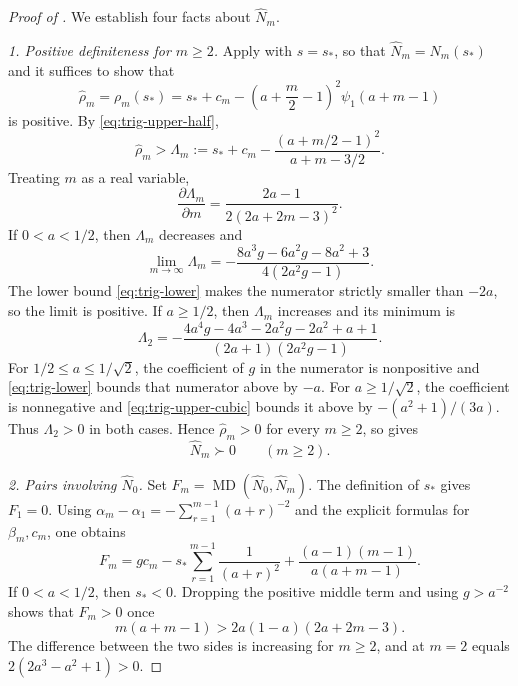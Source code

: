 \documentclass[11pt,a4paper]{amsart}
\numberwithin{equation}{section}
\theoremstyle{plain}
\theoremstyle{definition}
\newcommand{\MD}{\operatorname{MD}}
\begin{document}
\begin{proof}[Proof of ]
We establish four facts about \(\widehat N_m\).

\emph{1.  Positive definiteness for \(m\ge2\).}
Apply  with \(s=s_*\), so that \(\widehat N_m=N_m(s_*)\) and it suffices to show that
\[
 \widehat\rho_m
 =\rho_m(s_*)
 =s_*+c_m-\left(a+\frac m2-1\right)^2\psi_1(a+m-1)
\]
is positive.
By \eqref{eq:trig-upper-half},
\[
 \widehat\rho_m>\Lambda_m
 :=s_*+c_m-
 \frac{(a+m/2-1)^2}{a+m-3/2}.
\]
Treating \(m\) as a real variable,
\begin{equation}\label{eq:Lm-derivative}
 \frac{\partial \Lambda_m}{\partial m}
 =\frac{2a-1}{2(2a+2m-3)^2}.
\end{equation}
If \(0<a<1/2\), then \(\Lambda_m\) decreases and
\[
 \lim_{m\to\infty}\Lambda_m
 =-\frac{8a^3g-6a^2g-8a^2+3}{4(2a^2g-1)}.
\]
The lower bound \eqref{eq:trig-lower} makes the numerator strictly smaller than
\(-2a\), so the limit is positive.  If \(a\ge1/2\), then \(\Lambda_m\) increases and
its minimum is
\[
 \Lambda_2=-\frac{4a^4g-4a^3-2a^2g-2a^2+a+1}
 {(2a+1)(2a^2g-1)}.
\]
For \(1/2\le a\le1/\sqrt2\), the coefficient of \(g\) in the numerator is
nonpositive and \eqref{eq:trig-lower} bounds that numerator above by \(-a\).
For \(a\ge1/\sqrt2\), the coefficient is nonnegative and
\eqref{eq:trig-upper-cubic} bounds it above by
\(-(a^2+1)/(3a)\).  Thus \(\Lambda_2>0\) in both cases.  Hence
\(\widehat\rho_m>0\) for every \(m\ge2\), so  gives
\begin{equation}\label{eq:Nhat-m-pd}
 \widehat N_m\succ0\qquad(m\ge2).
\end{equation}

\emph{2.  Pairs involving \(\widehat N_0\).}
Set
\(F_m=\MD(\widehat N_0,\widehat N_m)\).  The definition of \(s_*\) gives
\(F_1=0\).  Using
\(\alpha_m-\alpha_1=-\sum_{r=1}^{m-1}(a+r)^{-2}\) and the explicit formulas for
\(\beta_m,c_m\), one obtains
\begin{equation}\label{eq:Fm-boundary}
 F_m
 =gc_m-s_*\sum_{r=1}^{m-1}\frac1{(a+r)^2}
 +\frac{(a-1)(m-1)}{a(a+m-1)}.
\end{equation}
If \(0<a<1/2\), then \(s_*<0\).  Dropping the positive middle term and using
\(g>a^{-2}\) shows that \(F_m>0\) once
\[
 m(a+m-1)>2a(1-a)(2a+2m-3).
\]
The difference between the two sides is increasing for \(m\ge2\), and at
\(m=2\) equals \(2(2a^3-a^2+1)>0\).


\end{proof}
\end{document}
